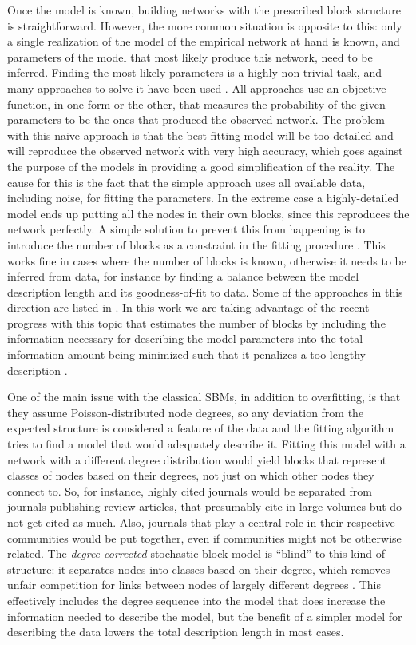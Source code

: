 \documentclass[a4paper,12pt]{article}
\begin{document}
Once the model is known, building networks with the prescribed block structure is straightforward. However, the more common situation is opposite to this: 
only a single realization of the model of the empirical network at hand is known, and parameters of the model that most likely produce this network, need to be inferred. Finding the most likely parameters is a highly non-trivial task, and many approaches to solve it have been used \citep{Wasserman1987}.
All approaches use an objective function, in one form or the other, that measures the
probability of the given parameters to be the ones that produced the observed network.
The problem with this naive approach is that the best fitting model will be too detailed and will reproduce the observed network with very high accuracy,
which goes against the purpose of the models in providing a good simplification of the reality.
The cause for this is the fact that the simple approach uses all available data, including noise,  for fitting the parameters.
In the extreme case a highly-detailed model ends up putting all the nodes in their own blocks, since this reproduces
the network perfectly. A simple solution to prevent this from happening is to introduce
the number of blocks as a constraint in the fitting procedure \citep{Karrer2011}.
This works fine in cases where the number of blocks is known, otherwise it needs to be inferred from data,
for instance by finding a balance between the model description length and its goodness-of-fit to data.
Some of the approaches in this direction are listed in \citet{Latouche2012Variational}.
In this work we are taking advantage of the recent progress with this topic that estimates the number of blocks by including the information necessary for describing the model parameters into the total 
information amount being minimized such that it penalizes a too lengthy description \citep{Peixoto_parsimonious_2013,Peixoto_model_2014}.

One of the main issue with the classical SBMs, in addition to overfitting, is that 
they assume Poisson-distributed node degrees, so any deviation from the expected structure is considered a feature of the data and the fitting algorithm tries to find
a model that would adequately describe it. Fitting this model with a network with a different degree distribution would yield blocks that represent classes of nodes based 
on their degrees, not just on which other nodes they connect to.
So, for instance, highly cited 
journals would be separated from journals publishing review articles, that presumably cite 
in large volumes but do not get cited as much. Also, journals that play a central role in 
their respective communities would be put together, even if communities might not be
otherwise related.
The \emph{degree-corrected} stochastic block model is ``blind'' to this kind of structure:
it separates nodes into classes based on their degree, which removes unfair competition for
links between nodes of largely different degrees \citep{Karrer2011}.
This effectively includes the degree sequence into the model that does increase the information needed to describe the model, but the benefit of a simpler model for describing 
the data lowers the total description length in most cases.
\end{document}
